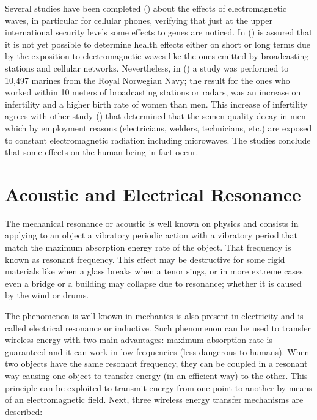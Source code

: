 \documentclass{intech}
\begin{document}
Several studies have been completed (\cite{RES15,RES16}) about the effects of electromagnetic waves, in particular for cellular phones, verifying that just at the upper international security levels some effects to genes are noticed. In (\cite{RES13}) is assured that it is not yet possible to determine health effects either on short or long terms due by the exposition to electromagnetic waves like the ones emitted by broadcasting stations and cellular networks. Nevertheless, in (\cite{RES14}) a study was performed to 10,497 marines from the Royal Norwegian Navy; the result for the ones who worked within 10 meters of broadcasting stations or radars, was an increase on infertility and a higher birth rate of women than men. This increase of infertility agrees with other study (\cite{RES14x}) that determined that the semen quality decay in men which by employment reasons (electricians, welders, technicians, etc.) are exposed to constant electromagnetic radiation including microwaves. The studies conclude that some effects on the human being in fact occur.

\section{Acoustic and Electrical Resonance}

The mechanical resonance or acoustic is well known on physics and consists in applying to an object a vibratory periodic action with a vibratory period that match the maximum absorption energy rate of the object. That frequency is known as resonant frequency. This effect may be destructive for some rigid materials like when a glass breaks when a tenor sings, or in more extreme cases even a bridge or a building may collapse due to resonance; whether it is caused by the wind or drums.


The phenomenon is well known in mechanics is also present in electricity and is called electrical resonance or inductive. Such phenomenon can be used to transfer wireless energy with two main advantages: maximum absorption rate is guaranteed and it can work in low frequencies (less dangerous to humans). When two objects have the same resonant frequency, they can be coupled in a resonant way causing one object to transfer energy (in an efficient way) to the other. This principle can be exploited to transmit energy from one point to another by means of an electromagnetic field. Next, three wireless energy transfer mechanisms are described:
\end{document}

